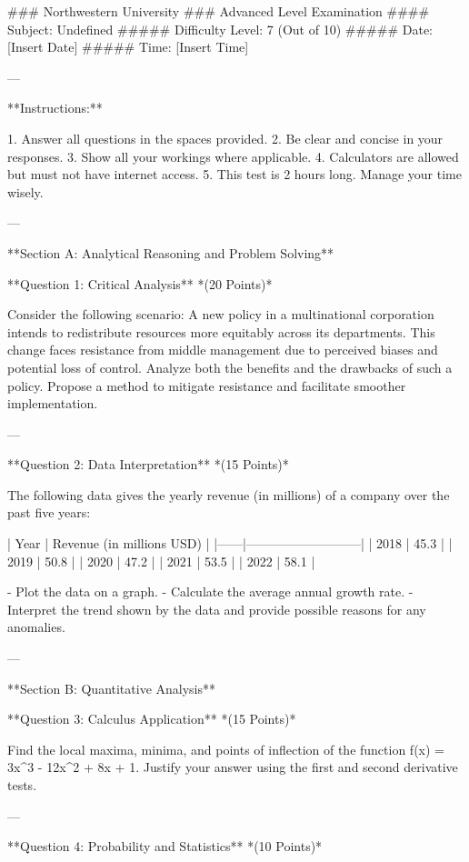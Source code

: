 \documentclass{article}
\begin{document}
### Northwestern University
### Advanced Level Examination
#### Subject: Undefined
##### Difficulty Level: 7 (Out of 10)
##### Date: [Insert Date]
##### Time: [Insert Time]

---

**Instructions:**

1. Answer all questions in the spaces provided.
2. Be clear and concise in your responses.
3. Show all your workings where applicable.
4. Calculators are allowed but must not have internet access.
5. This test is 2 hours long. Manage your time wisely.

---

**Section A: Analytical Reasoning and Problem Solving**

**Question 1: Critical Analysis**  
*(20 Points)*

Consider the following scenario: A new policy in a multinational corporation intends to redistribute resources more equitably across its departments. This change faces resistance from middle management due to perceived biases and potential loss of control. Analyze both the benefits and the drawbacks of such a policy. Propose a method to mitigate resistance and facilitate smoother implementation.

---

**Question 2: Data Interpretation**  
*(15 Points)*

The following data gives the yearly revenue (in millions) of a company over the past five years:

| Year | Revenue (in millions USD) |
|------|---------------------------|
| 2018 | 45.3                      |
| 2019 | 50.8                      |
| 2020 | 47.2                      |
| 2021 | 53.5                      |
| 2022 | 58.1                      |

- Plot the data on a graph.
- Calculate the average annual growth rate.
- Interpret the trend shown by the data and provide possible reasons for any anomalies.

---

**Section B: Quantitative Analysis**

**Question 3: Calculus Application**  
*(15 Points)*

Find the local maxima, minima, and points of inflection of the function f(x) = 3x^3 - 12x^2 + 8x + 1. Justify your answer using the first and second derivative tests.

---

**Question 4: Probability and Statistics**  
*(10 Points)*
\end{document}
